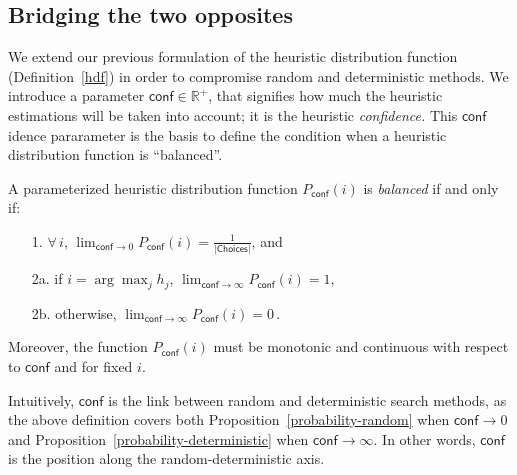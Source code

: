 \documentclass{ws-ijait}
\begin{document}
\subsection{Bridging the two opposites}

We extend our previous formulation of the heuristic distribution function (Definition~\ref{hdf}) in order to compromise random and deterministic methods. We introduce a parameter $\mathsf{conf} \in \mathbb{R}^+$, that signifies how much the heuristic estimations will be taken into account; it is the heuristic \emph{confidence.} This $\mathsf{conf}$idence pararameter is the basis to define the condition when a heuristic distribution function is ``balanced''.
\begin{definition}
\label{balanced}
A parameterized heuristic distribution function $P_\mathsf{conf} (i)$ is \emph{balanced} if and only if:
\begin{enumerate}
\item[1.]
$\forall \, i$,
${\displaystyle \lim_{\mathsf{conf} \to 0} }  \!\!
P_\mathsf{conf} (i) = \frac{1}{|\mathsf{Choices}|}$, and
%
\item[2a.]
if $i = \arg\max_j h_j$,
${\displaystyle \lim_{\mathsf{conf} \to \infty} }  \!\!\!\!
        P_\mathsf{conf} (i) = 1$,
%
\item[2b.]
otherwise,
${\displaystyle \lim_{\mathsf{conf} \to \infty} }  \!\!\!\!
        P_\mathsf{conf} (i) = 0 \,$.
\end{enumerate}
Moreover, the function $P_\mathsf{conf} (i)$ must be monotonic and continuous with respect to $\mathsf{conf}$ and for fixed $i$.
\end{definition}
Intuitively, $\mathsf{conf}$ is the link between random and deterministic search methods, as the above definition covers both Proposition~\ref{probability-random} when $\mathsf{conf} \to 0$ and Proposition~\ref{probability-deterministic} when $\mathsf{conf} \to \infty$. In other words, $\mathsf{conf}$ is the position along the random-deterministic axis.
\end{document}
